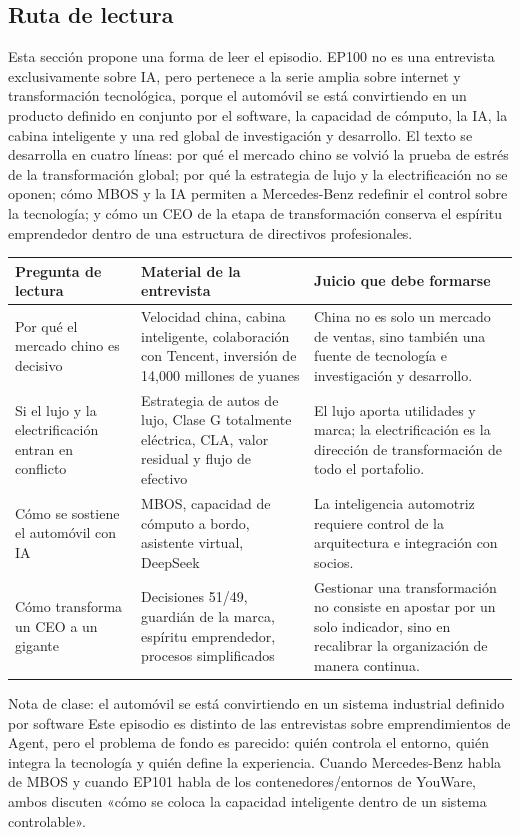 \subsection{Ruta de lectura}

Esta sección propone una forma de leer el episodio. EP100 no es una entrevista exclusivamente sobre IA, pero pertenece a la serie amplia sobre internet y transformación tecnológica, porque el automóvil se está convirtiendo en un producto definido en conjunto por el software, la capacidad de cómputo, la IA, la cabina inteligente y una red global de investigación y desarrollo. El texto se desarrolla en cuatro líneas: por qué el mercado chino se volvió la prueba de estrés de la transformación global; por qué la estrategia de lujo y la electrificación no se oponen; cómo MBOS y la IA permiten a Mercedes-Benz redefinir el control sobre la tecnología; y cómo un CEO de la etapa de transformación conserva el espíritu emprendedor dentro de una estructura de directivos profesionales.

\noindent\begin{tabularx}{\textwidth}{p{}p{}X}
\toprule
Pregunta de lectura & Material de la entrevista & Juicio que debe formarse \\
\midrule
Por qué el mercado chino es decisivo & Velocidad china, cabina inteligente, colaboración con Tencent, inversión de 14,000 millones de yuanes & China no es solo un mercado de ventas, sino también una fuente de tecnología e investigación y desarrollo. \\
Si el lujo y la electrificación entran en conflicto & Estrategia de autos de lujo, Clase G totalmente eléctrica, CLA, valor residual y flujo de efectivo & El lujo aporta utilidades y marca; la electrificación es la dirección de transformación de todo el portafolio. \\
Cómo se sostiene el automóvil con IA & MBOS, capacidad de cómputo a bordo, asistente virtual, DeepSeek & La inteligencia automotriz requiere control de la arquitectura e integración con socios. \\
Cómo transforma un CEO a un gigante & Decisiones 51/49, guardián de la marca, espíritu emprendedor, procesos simplificados & Gestionar una transformación no consiste en apostar por un solo indicador, sino en recalibrar la organización de manera continua. \\
\bottomrule
\end{tabularx}

\begin{knowledgebox}{Nota de clase: el automóvil se está convirtiendo en un sistema industrial definido por software}
Este episodio es distinto de las entrevistas sobre emprendimientos de Agent, pero el problema de fondo es parecido: quién controla el entorno, quién integra la tecnología y quién define la experiencia. Cuando Mercedes-Benz habla de MBOS y cuando EP101 habla de los contenedores/entornos de YouWare, ambos discuten «cómo se coloca la capacidad inteligente dentro de un sistema controlable».
\end{knowledgebox}

